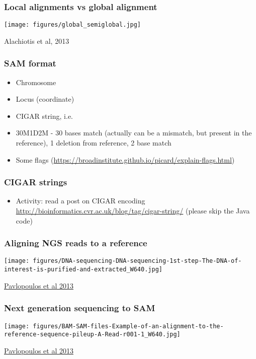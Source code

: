 \documentclass{beamer}
\begin{document}
\begin{frame}
  \frametitle{Local alignments vs global alignment}
\centering
\texttt{[image: figures/global\_semiglobal.jpg]}

Alachiotis et al, 2013
\end{frame}




\begin{frame}
  \frametitle{SAM format}

  \begin{itemize}
  \item  Chromosome
  \item  Locus (coordinate)
  \item  CIGAR string, i.e.
  \item 30M1D2M - 30 bases match (actually can be a mismatch, but present in the reference), 1 deletion from reference, 2 base match	
  \item  Some flags (\url{https://broadinstitute.github.io/picard/explain-flags.html})

  \end{itemize}

\end{frame}


\begin{frame}
  \frametitle{CIGAR strings}
  \begin{itemize}
  \item Activity: read a post on CIGAR encoding \url{http://bioinformatics.cvr.ac.uk/blog/tag/cigar-string/} (please skip the Java code)
  \end{itemize}
\end{frame}


\begin{frame}
  \frametitle{Aligning NGS reads to a reference}
\centering
\texttt{[image: figures/DNA-sequencing-DNA-sequencing-1st-step-The-DNA-of-interest-is-purified-and-extracted\_W640.jpg]}

\href{https://biodatamining.biomedcentral.com/articles/10.1186/1756-0381-6-13}{Pavlopoulos et al 2013}
\end{frame}





\begin{frame}
  \frametitle{Next generation sequencing to SAM}
\centering

\hspace{-1cm} \texttt{[image: figures/BAM-SAM-files-Example-of-an-alignment-to-the-reference-sequence-pileup-A-Read-r001-1\_W640.jpg]}

\href{https://biodatamining.biomedcentral.com/articles/10.1186/1756-0381-6-13}{Pavlopoulos et al 2013}
\end{frame}
\end{document}
